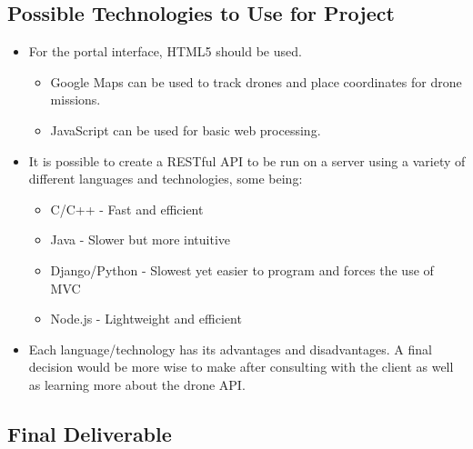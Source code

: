 \documentclass{article}
\begin{document}
	\subsection{Possible Technologies to Use for Project}
		\begin{itemize}
			\item For the portal interface, HTML5 should be used.
			\begin{itemize}
				\item Google Maps can be used to track drones and place coordinates for drone missions.
				\item JavaScript can be used for basic web processing.
			\end{itemize}
			\item It is possible to create a RESTful API to be run on a server using a variety of different languages and technologies, some being:
			\begin{itemize}
				\item C/C++ - Fast and efficient
				\item Java - Slower but more intuitive
				\item Django/Python - Slowest yet easier to program and forces the use of MVC
				\item Node.js - Lightweight and efficient
			\end{itemize}
			\item Each language/technology has its advantages and disadvantages. A final decision would be more wise to make after consulting with the client as well as learning more about the drone API.
		\end{itemize}
	\subsection{Final Deliverable}
\end{document}
